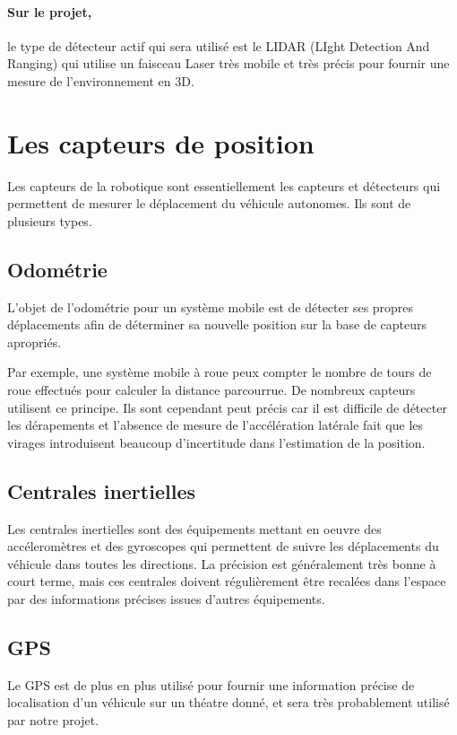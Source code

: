 \documentclass[12pt,a4paper]{report}
\begin{document}
\paragraph{Sur le projet,} le type de détecteur actif qui sera utilisé est le LIDAR (LIght Detection And Ranging) qui utilise un faisceau Laser très mobile et très précis pour fournir une mesure de l'environnement en 3D.
 

\section{Les capteurs de position}

Les capteurs de la robotique sont essentiellement les capteurs et détecteurs qui permettent de mesurer le déplacement du véhicule autonomes. Ils sont de plusieurs types.

\subsection{Odométrie}
L'objet de l'odométrie pour un système mobile est de détecter ses propres déplacements afin de déterminer sa nouvelle position sur la base de capteurs apropriés.


Par exemple, une système mobile à roue peux compter le nombre de tours de roue effectués pour calculer la distance parcourrue. De nombreux capteurs utilisent ce principe. Ils sont cependant peut précis car il est difficile de détecter les dérapements et l'absence de mesure de l'accélération latérale fait que les virages introduisent beaucoup d'incertitude dans l'estimation de la position.


\subsection{Centrales inertielles} 
Les centrales inertielles sont des équipements mettant en oeuvre des accéleromètres et des gyroscopes qui permettent de suivre les déplacements du véhicule dans toutes les directions. La précision est généralement très bonne à court terme, mais ces centrales doivent régulièrement être recalées dans l'espace par des informations précises issues d'autres équipements.

\subsection{GPS}
Le GPS est de plus en plus utilisé pour fournir une information précise de localisation d'un véhicule sur un théatre donné, et sera très probablement utilisé par notre projet.
\end{document}
